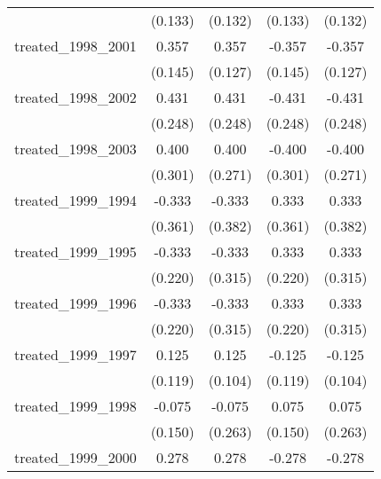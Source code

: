 {\begin{tabular}{l*{4}{c}}
            &     (0.133)         &     (0.132)         &     (0.133)         &     (0.132)         \\
[1em]
treated\_1998\_2001&       0.357\sym{*}  &       0.357\sym{**} &      -0.357\sym{*}  &      -0.357\sym{**} \\
            &     (0.145)         &     (0.127)         &     (0.145)         &     (0.127)         \\
[1em]
treated\_1998\_2002&       0.431         &       0.431         &      -0.431         &      -0.431         \\
            &     (0.248)         &     (0.248)         &     (0.248)         &     (0.248)         \\
[1em]
treated\_1998\_2003&       0.400         &       0.400         &      -0.400         &      -0.400         \\
            &     (0.301)         &     (0.271)         &     (0.301)         &     (0.271)         \\
[1em]
treated\_1999\_1994&      -0.333         &      -0.333         &       0.333         &       0.333         \\
            &     (0.361)         &     (0.382)         &     (0.361)         &     (0.382)         \\
[1em]
treated\_1999\_1995&      -0.333         &      -0.333         &       0.333         &       0.333         \\
            &     (0.220)         &     (0.315)         &     (0.220)         &     (0.315)         \\
[1em]
treated\_1999\_1996&      -0.333         &      -0.333         &       0.333         &       0.333         \\
            &     (0.220)         &     (0.315)         &     (0.220)         &     (0.315)         \\
[1em]
treated\_1999\_1997&       0.125         &       0.125         &      -0.125         &      -0.125         \\
            &     (0.119)         &     (0.104)         &     (0.119)         &     (0.104)         \\
[1em]
treated\_1999\_1998&      -0.075         &      -0.075         &       0.075         &       0.075         \\
            &     (0.150)         &     (0.263)         &     (0.150)         &     (0.263)         \\
[1em]
treated\_1999\_2000&       0.278         &       0.278         &      -0.278         &      -0.278         \\

\end{tabular}}
